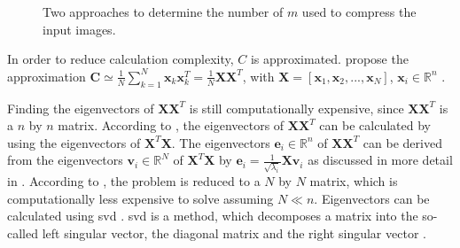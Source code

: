 \begin{figure}%
    \centering
    \qquad
    \caption[Approaches to find the number of \eigenfaces{}]{Two approaches to determine the number of \eigenfaces{} $m$ used to compress the input images.}%
    \label{fig:det_n_comp}%
\end{figure}

In order to reduce calculation complexity, $C$ is approximated.
\citeauthor{eigenfaces1997} propose the approximation $\textbf{C} \simeq \frac{1}{N}\sum_{k=1}^{N}\textbf{x}_{k}\textbf{x}_{k}^{T} = \frac{1}{N}\textbf{X}\textbf{X}^{T}$, 
with $\textbf{X} = \left[ \textbf{x}_{1}, \textbf{x}_{2}, ..., \textbf{x}_{N} \right]$, $\textbf{x}_i \in \mathbb{R}^{n}$ \cite{eigenfaces1997}.

Finding the eigenvectors of $\textbf{X}\textbf{X}^{T}$ is still computationally expensive, since $\textbf{X}\textbf{X}^{T}$ is a $n$ by $n$ matrix.
According to \citeauthor{eigenfaces1997}, the eigenvectors of $\textbf{X}\textbf{X}^{T}$ can be calculated by using the eigenvectors of $\textbf{X}^{T}\textbf{X}$.
The eigenvectors $\textbf{e}_i \in \mathbb{R}^{n}$ of $\textbf{X}\textbf{X}^{T}$ can be derived from the eigenvectors $\textbf{v}_i \in \mathbb{R}^{N}$ of $\textbf{X}^{T}\textbf{X}$ by 
$\textbf{e}_i = \frac{1}{\sqrt{\lambda_i}}\textbf{X}\textbf{v}_i$ as discussed in more detail in \cite{eigenfaces1997}.
According to \citeauthor{dim_reduction2021}, the problem is reduced to a $N$ by $N$ matrix, which is computationally less expensive to solve assuming $N \ll n$.
Eigenvectors can be calculated using \ac{svd} \cite{eigenfaces1997}.
\ac{svd} is a method, which decomposes a matrix into the so-called left singular vector, the diagonal matrix and the right singular vector \cite{dim_reduction2021}. 

